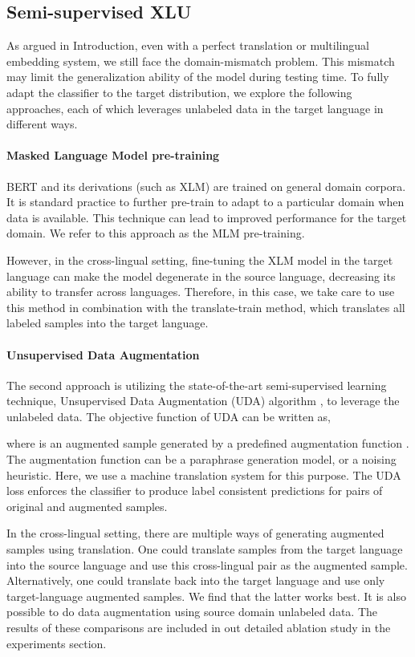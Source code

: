 \documentclass{article} \usepackage{iclr2020_conference,times}
\begin{document}
\subsection{Semi-supervised XLU}
\label{sec:uda}

As argued in Introduction, even with a perfect translation or multilingual embedding system, we still face the domain-mismatch problem.     
This mismatch may limit the generalization ability of the model during testing time. 
To fully adapt the classifier to the target distribution, we explore the following approaches, each of which leverages unlabeled data in the target language in different ways.

\paragraph{Masked Language Model pre-training} BERT \citep{devlin2018bert} and its derivations (such as XLM) are trained on general domain corpora.  It is standard practice to further pre-train to adapt to a particular domain when data is available.  This technique can lead to improved performance for the target domain. We refer to this approach as the MLM pre-training.

However, in the cross-lingual setting, fine-tuning the XLM model in the target language can make the model degenerate in the source language, decreasing its ability to transfer across languages.  Therefore, in this case, we take care to use this method in combination with the translate-train method, which translates all labeled samples into the target language.


\paragraph{Unsupervised Data Augmentation} The second approach is utilizing the state-of-the-art semi-supervised learning technique, Unsupervised Data Augmentation (UDA) algorithm \citep{xie2019unsupervised}, to leverage the unlabeled data. The objective function of UDA can be written as,

where  is an augmented sample generated by a predefined augmentation function . 
The augmentation function can be a paraphrase generation model, or a noising heuristic.  
Here, we use a machine translation system for this purpose.
The UDA loss enforces the classifier to produce label consistent predictions for pairs of original and augmented samples. 

In the cross-lingual setting, there are multiple ways of generating augmented samples using translation.  One could translate samples from the target language into the source language and use this cross-lingual pair as the augmented sample.  Alternatively, one could translate back into the target language and use only target-language augmented samples.  We find that the latter works best.
It is also possible to do data augmentation using source domain unlabeled data.  The results of these comparisons are included in out detailed ablation study in the experiments section. 
\end{document}
